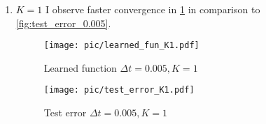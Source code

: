 \documentclass[a4paper,11pt]{scrartcl}
\newcommand*{\Dt}{\Delta{}t}
\begin{document}
\begin{enumerate}
\begin{enumerate}[leftmargin=1em]
  \item $K=1$
    I observe faster convergence in \cref{fig:test_error_K1} in comparison to \cref{fig:test_error_0.005}.
    \begin{figure}[h]
        \begin{minipage}[b]{.5\linewidth}
          \centering
          \texttt{[image: pic/learned\_fun\_K1.pdf]}
          \caption{Learned function $\Dt=0.005, K=1$}
          \label{fig:learned_fun_K1}
        \end{minipage}%
        \begin{minipage}[b]{.5\linewidth}
          \centering
          \texttt{[image: pic/test\_error\_K1.pdf]}
          \caption{Test error $\Dt=0.005, K=1$}
          \label{fig:test_error_K1}
        \end{minipage}
    \end{figure}

\end{enumerate}

\end{enumerate}
\end{document}
